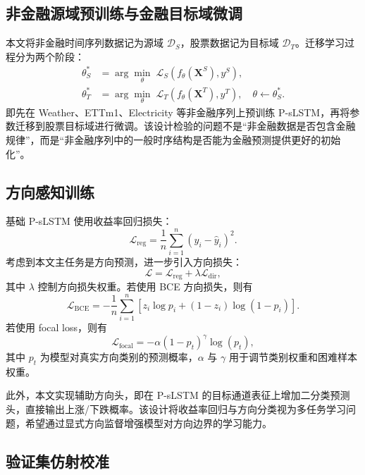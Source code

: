 \documentclass[UTF8,zihao=-4,twocolumn,fontset=fandol]{ctexart}
\begin{document}
\subsection{非金融源域预训练与金融目标域微调}

本文将非金融时间序列数据记为源域 $\mathcal{D}_{S}$，股票数据记为目标域 $\mathcal{D}_{T}$。迁移学习过程分为两个阶段：
\begin{align}
  \theta^{*}_{S} &= \arg\min_{\theta}\;\mathcal{L}_{S}\left(f_{\theta}(\bm{X}^{S}),y^{S}\right), \\
  \theta^{*}_{T} &= \arg\min_{\theta}\;\mathcal{L}_{T}\left(f_{\theta}(\bm{X}^{T}),y^{T}\right),\quad \theta\leftarrow \theta^{*}_{S}.
\end{align}
即先在 Weather、ETTm1、Electricity 等非金融序列上预训练 P-sLSTM，再将参数迁移到股票目标域进行微调。该设计检验的问题不是“非金融数据是否包含金融规律”，而是“非金融序列中的一般时序结构是否能为金融预测提供更好的初始化”。

\subsection{方向感知训练}

基础 P-sLSTM 使用收益率回归损失：
\begin{equation}
  \mathcal{L}_{\mathrm{reg}}=\frac{1}{n}\sum_{i=1}^{n}\left(y_i-\hat y_i\right)^2.
\end{equation}
考虑到本文主任务是方向预测，进一步引入方向损失：
\begin{equation}
  \mathcal{L}=\mathcal{L}_{\mathrm{reg}}+\lambda\mathcal{L}_{\mathrm{dir}},
\end{equation}
其中 $\lambda$ 控制方向损失权重。若使用 BCE 方向损失，则有
\begin{equation}
  \mathcal{L}_{\mathrm{BCE}}=-\frac{1}{n}\sum_{i=1}^{n}\left[z_i\log p_i+(1-z_i)\log(1-p_i)\right].
\end{equation}
若使用 focal loss，则有
\begin{equation}
  \mathcal{L}_{\mathrm{focal}}=-\alpha(1-p_t)^{\gamma}\log(p_t),
\end{equation}
其中 $p_t$ 为模型对真实方向类别的预测概率，$\alpha$ 与 $\gamma$ 用于调节类别权重和困难样本权重。

此外，本文实现辅助方向头，即在 P-sLSTM 的目标通道表征上增加二分类预测头，直接输出上涨/下跌概率。该设计将收益率回归与方向分类视为多任务学习问题，希望通过显式方向监督增强模型对方向边界的学习能力。

\subsection{验证集仿射校准}
\end{document}
